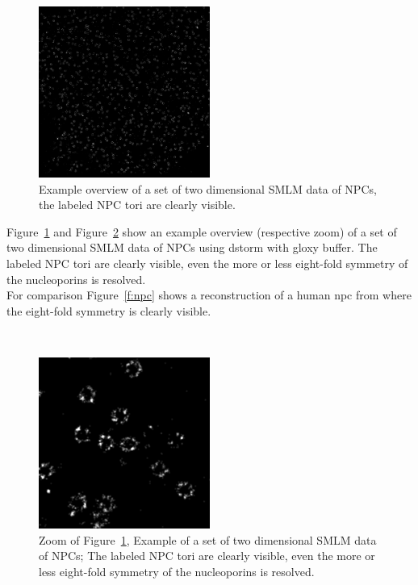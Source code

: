 \documentclass[11pt, a4paper, oneside, twocolumn]{report}
\newcommand{\x}[1]{#1\index{#1}}
\begin{document}
\begin{figure}[h]
  \centering
  \includegraphics[width=0.5\textwidth]{npc/npc2048.png}
  \caption{Example overview of a set of two dimensional SMLM data of
    NPCs, the labeled NPC tori are clearly visible.}
  \label{f:npco}
\end{figure}

Figure~\ref{f:npco} and Figure~\ref{f:npcz} show an example overview
(respective zoom) of a set of two dimensional SMLM data of NPCs using
\gls{dstorm} with \gls{gloxy} buffer. The labeled NPC tori are clearly
visible, even the more or less eight-fold symmetry of the
\x{nucleoporin}s is resolved.\\

For comparison Figure~\ref{f:npc} shows a reconstruction of a human
\gls{npc} from \cite{npc} where the eight-fold symmetry is clearly
visible.

\newpage
~ %
\begin{figure}[t!]
  \centering
  \includegraphics[width=0.5\textwidth]{npc/npc256.png}
  \caption{Zoom of Figure~\ref{f:npco}, Example of a set of two
    dimensional SMLM data of NPCs; The labeled NPC tori are clearly
    visible, even the more or less eight-fold symmetry of the
    nucleoporins is resolved.}
  \label{f:npcz}
\end{figure}
\end{document}
